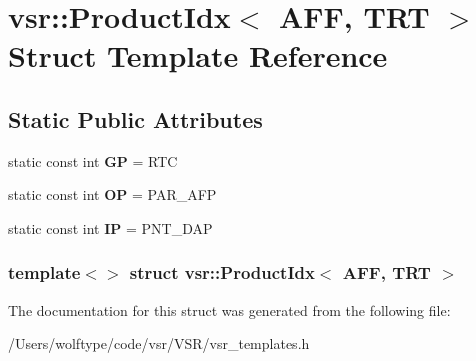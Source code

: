 \hypertarget{structvsr_1_1_product_idx_3_01_a_f_f_00_01_t_r_t_01_4}{\section{vsr\-:\-:Product\-Idx$<$ A\-F\-F, T\-R\-T $>$ Struct Template Reference}
\label{structvsr_1_1_product_idx_3_01_a_f_f_00_01_t_r_t_01_4}
}
\subsection*{Static Public Attributes}
\begin{DoxyCompactItemize}
\item 
\hypertarget{structvsr_1_1_product_idx_3_01_a_f_f_00_01_t_r_t_01_4_a2710c669655cb75debda9f9e69bf97e6}{static const int {\bfseries G\-P} = R\-T\-C}\label{structvsr_1_1_product_idx_3_01_a_f_f_00_01_t_r_t_01_4_a2710c669655cb75debda9f9e69bf97e6}

\item 
\hypertarget{structvsr_1_1_product_idx_3_01_a_f_f_00_01_t_r_t_01_4_a68f4c9eeae6f5f4ee333497f12b4ffe4}{static const int {\bfseries O\-P} = P\-A\-R\-\_\-\-A\-F\-P}\label{structvsr_1_1_product_idx_3_01_a_f_f_00_01_t_r_t_01_4_a68f4c9eeae6f5f4ee333497f12b4ffe4}

\item 
\hypertarget{structvsr_1_1_product_idx_3_01_a_f_f_00_01_t_r_t_01_4_a7b8a94a9a2b6c25fdcb99d5edab9c823}{static const int {\bfseries I\-P} = P\-N\-T\-\_\-\-D\-A\-P}\label{structvsr_1_1_product_idx_3_01_a_f_f_00_01_t_r_t_01_4_a7b8a94a9a2b6c25fdcb99d5edab9c823}

\end{DoxyCompactItemize}
\subsubsection*{template$<$$>$ struct vsr\-::\-Product\-Idx$<$ A\-F\-F, T\-R\-T $>$}



The documentation for this struct was generated from the following file\-:\begin{DoxyCompactItemize}
\item 
/\-Users/wolftype/code/vsr/\-V\-S\-R/vsr\-\_\-templates.\-h\end{DoxyCompactItemize}
